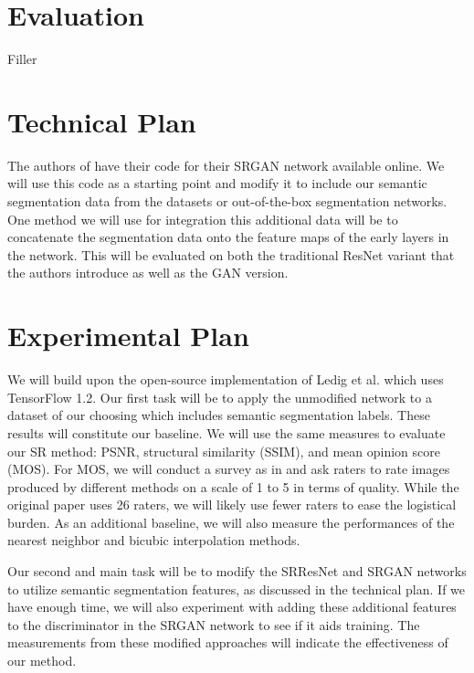 \documentclass[10pt,twocolumn,letterpaper]{article}
\begin{document}
\section{Evaluation}
\label{sec:evaluation}

Filler


\section{Technical Plan}
The authors of \cite{SRGAN} have their code for their SRGAN network available
online. We will use this code as a starting point and modify it to include our
semantic segmentation data from the datasets or out-of-the-box segmentation
networks. One method we will use for integration this additional data will be
to concatenate the segmentation data onto the feature maps of the early layers
in the network. This will be evaluated on both the traditional ResNet variant
that the authors introduce as well as the GAN version.  


\section{Experimental Plan}
We will build upon the open-source implementation of Ledig et al. \cite{SRGAN}
which uses TensorFlow 1.2. Our first task will be to apply the unmodified
network to a dataset of our choosing which includes semantic segmentation
labels. These results will constitute our baseline. We will use the same
measures to evaluate our SR method: PSNR, structural similarity (SSIM), and
mean opinion score (MOS). For MOS, we will conduct a survey as in \cite{SRGAN}
and ask raters to rate images produced by different methods on a scale of 1 to
5 in terms of quality. While the original paper uses 26 raters, we will likely
use fewer raters to ease the logistical burden. As an additional baseline, we
will also measure the performances of the nearest neighbor and bicubic
interpolation methods.

Our second and main task will be to modify the SRResNet and SRGAN networks to
utilize semantic segmentation features, as discussed in the technical plan. If
we have enough time, we will also experiment with adding these additional
features to the discriminator in the SRGAN network to see if it aids training.
The measurements from these modified approaches will indicate the effectiveness
of our method.
\end{document}
